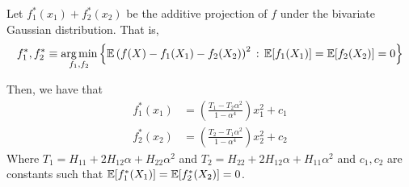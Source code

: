 \begin{proposition}
Let $f^*_1(x_1) + f^*_2(x_2)$ be the additive projection of $f$ under the bivariate Gaussian distribution. That is,
\begin{align*} 
f^*_1, f^*_2 \equiv \mathop{\text{\rm arg\,min}}_{f_1, f_2} \Big\{ {\mathbb E} \left(f(X) - f_1(X_1) - f_2(X_2)\right)^2 \,:\, {\mathbb E}[f_1(X_1)] = {\mathbb E}[f_2(X_2)] = 0 \Big\}
\end{align*}

Then, we have that 
\begin{align*}
f^*_1(x_1) &= \left( \frac{T_1 - T_2 \alpha^2}{1 - \alpha^4} \right) x_1^2 + c_1 \\
f^*_2(x_2) &= \left( \frac{T_2 - T_1\alpha^2}{1 - \alpha^4} \right) x_2^2 + c_2
\end{align*}
Where $T_1 = H_{11} + 2H_{12} \alpha + H_{22} \alpha^2$ and $T_2 = H_{22} + 2H_{12} \alpha + H_{11} \alpha^2$ and $c_1,c_2$ are constants such that ${\mathbb E}[f_1^*(X_1)] = {\mathbb E}[f_2^*(X_2)] = 0$.

\end{proposition}

